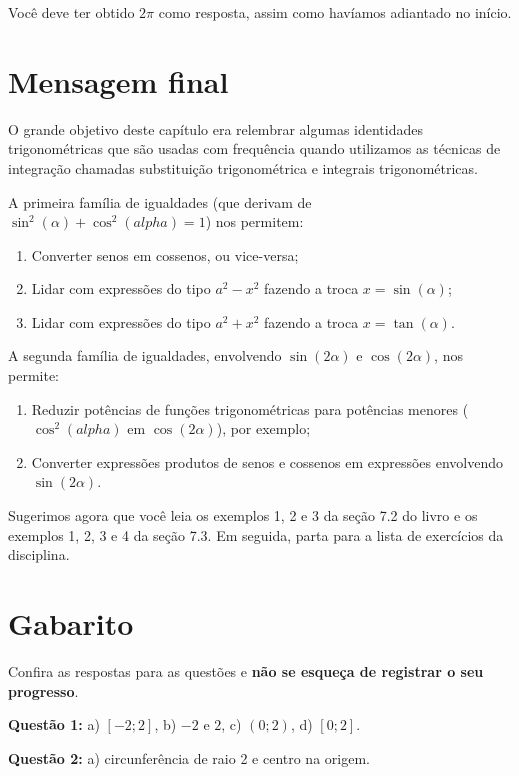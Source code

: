 \documentclass[main_estudante.tex]{subfiles}
\begin{document}
Você deve ter obtido $2\pi$ como resposta, assim como havíamos adiantado no início.

\section{Mensagem final}

O grande objetivo deste capítulo era relembrar algumas identidades trigonométricas que são usadas com frequência quando utilizamos as técnicas de integração chamadas substituição trigonométrica e integrais trigonométricas.

A primeira família de igualdades (que derivam de $\sin^2(\alpha)+\cos^2(alpha)=1$) nos permitem:
\begin{enumerate}[1)]
\item Converter senos em cossenos, ou vice-versa;
\item Lidar com expressões do tipo $a^2-x^2$ fazendo a troca $x=\sin(\alpha)$;
\item Lidar com expressões do tipo $a^2+x^2$ fazendo a troca $x=\tan(\alpha)$.
\end{enumerate}

A segunda família de igualdades, envolvendo $\sin(2\alpha)$ e $\cos(2\alpha)$, nos permite:
\begin{enumerate}[1)]
\item Reduzir potências de funções trigonométricas para potências menores ($\cos^2(alpha)$ em $\cos(2\alpha)$), por exemplo;
\item Converter expressões produtos de senos e cossenos em expressões envolvendo $\sin(2\alpha)$.
\end{enumerate}

Sugerimos agora que você leia os exemplos 1, 2 e 3 da seção 7.2 do livro  e os exemplos 1, 2, 3 e 4 da seção 7.3. Em seguida, parta para a lista de exercícios da disciplina.

\newpage

\section{Gabarito}

Confira as respostas para as questões e \textbf{não se esqueça de registrar o seu progresso}.

\noindent\textbf{Questão 1:} a) $[-2;2]$, b) $-2$ e $2$, c) $(0;2)$, d) $[0;2]$.

\noindent\textbf{Questão 2:} a) circunferência de raio 2 e centro na origem.
\end{document}
